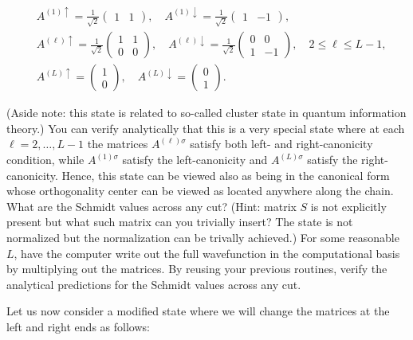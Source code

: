 \documentclass[12pt]{article}
\begin{document}
\begin{align*}
& A^{(1) \uparrow}=\frac{1}{\sqrt{2}}\left(\begin{array}{ll}
1 & 1
\end{array}\right), \quad A^{(1) \downarrow}=\frac{1}{\sqrt{2}}\left(\begin{array}{ll}
1 & -1
\end{array}\right),  \tag{27}\\
& A^{(\ell) \uparrow}=\frac{1}{\sqrt{2}}\left(\begin{array}{ll}
1 & 1 \\
0 & 0
\end{array}\right), \quad A^{(\ell) \downarrow}=\frac{1}{\sqrt{2}}\left(\begin{array}{cc}
0 & 0 \\
1 & -1
\end{array}\right), \quad 2 \leq \ell \leq L-1,  \tag{28}\\
& A^{(L) \uparrow}=\left(\begin{array}{l}
1 \\
0
\end{array}\right), \quad A^{(L) \downarrow}=\left(\begin{array}{l}
0 \\
1
\end{array}\right) . \tag{29}
\end{align*}


(Aside note: this state is related to so-called cluster state in quantum information theory.) You can verify analytically that this is a very special state where at each $\ell=2, \ldots, L-1$ the matrices $A^{(\ell) \sigma}$ satisfy both left- and right-canonicity condition, while $A^{(1) \sigma}$ satisfy the left-canonicity and $A^{(L) \sigma}$ satisfy the right-canonicity. Hence, this state can be viewed also as being in the canonical form whose orthogonality center can be viewed as located anywhere along the chain. What are the Schmidt values across any cut? (Hint: matrix $S$ is not explicitly present but what such matrix can you trivially insert? The state is not normalized but the normalization can be trivally achieved.) For some reasonable $L$, have the computer write out the full wavefunction in the computational basis by multiplying out the matrices. By reusing your previous routines, verify the analytical predictions for the Schmidt values across any cut.

Let us now consider a modified state where we will change the matrices at the left and right ends as follows:
\end{document}
